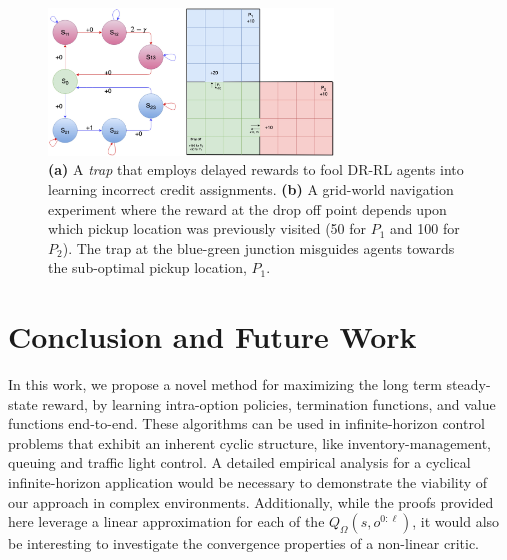 \documentclass[letterpaper]{article} %
\begin{document}
\begin{figure}[t]
\centering
\includegraphics[width=0.9\columnwidth,height=1.54in ]{BadCreditAndFRms.jpg} %
\caption{ \textbf{(a)} A \textit{trap} that employs delayed rewards to fool DR-RL agents into learning incorrect credit assignments. \textbf{(b)} A grid-world navigation experiment where the reward at the drop off point depends upon which pickup location was previously visited (50 for $P_1$ and 100 for $P_2$). The trap at the blue-green junction misguides agents towards the sub-optimal pickup location, $P_1$. }
\label{fig3}
\end{figure}

\vspace{-1.85mm}
\section{Conclusion and Future Work}
In this work, we propose a novel method for maximizing the long term steady-state reward, by learning intra-option policies, termination functions, and value functions end-to-end. These algorithms can be used in infinite-horizon control problems that exhibit an inherent cyclic structure, like inventory-management, queuing and traffic light control. A detailed empirical analysis for a cyclical infinite-horizon application would be necessary to demonstrate the viability of our approach in complex environments. Additionally, while the proofs provided here leverage a linear approximation for each of the $Q_\Omega(s,o^{0:\ell})$, it would also be interesting to investigate the convergence properties of a non-linear critic.
\end{document}
